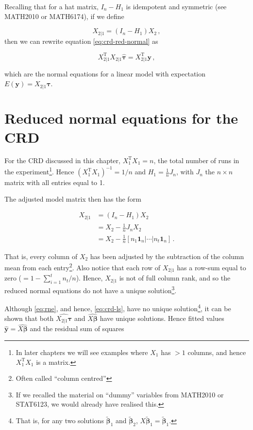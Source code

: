 \documentclass[
]{book}
\theoremstyle{definition}
\theoremstyle{definition}
\theoremstyle{definition}
\theoremstyle{definition}
\theoremstyle{remark}
\begin{document}
Recalling that for a hat matrix, \(I_n - H_1\) is idempotent and symmetric (see MATH2010 or MATH6174), if we define

\[
X_{2|1} = (I_n - H_1)X_2\,,
\]
then we can rewrite equation \eqref{eq:crd-red-normal} as

\begin{equation}
X_{2|1}^{\mathrm{T}}X_{2|1}\hat{\boldsymbol{\tau}} = X_{2|1}^{\mathrm{T}}\boldsymbol{y}\,, 
\label{eq:rne}
\end{equation}

which are the normal equations for a linear model with expectation \(E(\boldsymbol{y}) = X_{2|1}\boldsymbol{\tau}\).

\hypertarget{reduced-normal-equations-for-the-crd}{%
\section{Reduced normal equations for the CRD}\label{reduced-normal-equations-for-the-crd}}

For the CRD discussed in this chapter, \(X_1^{\mathrm{T}}X_1 = n\), the total number of runs in the experiment\footnote{In later chapters we will see examples where \(X_1\) has \(>1\) columns, and hence \(X_1^{\mathrm{T}}X_1\) is a matrix.}. Hence \((X_1^{\mathrm{T}}X_1)^{-1} = 1/n\) and \(H_1 = \frac{1}{n}J_n\), with \(J_n\) the \(n\times n\) matrix with all entries equal to 1.

The adjusted model matrix then has the form

\begin{align*}
X_{2|1} & = (I_n - H_1)X_2 \\
& = X_2 - \frac{1}{n}J_nX_2 \\
& = X_2 - \frac{1}{n}[n_1\boldsymbol{1}_n \vert \cdots \vert n_t\boldsymbol{1}_n]\,. 
\end{align*}

That is, every column of \(X_2\) has been adjusted by the subtraction of the column mean from each entry\footnote{Often called ``column centred''}. Also notice that each row of \(X_{2|1}\) has a row-sum equal to zero (\(= 1 - \sum_{i=1}^tn_t/n\)). Hence, \(X_{2|1}\) is not of full column rank, and so the reduced normal equations do not have a unique solution\footnote{If we recalled the material on ``dummy'' variables from MATH2010 or STAT6123, we would already have realised this.}.

Although \eqref{eq:rne}, and hence, \eqref{eq:crd-ls}, have no unique solution\footnote{That is, for any two solutions \(\tilde{\boldsymbol{\beta}}_1\) and \(\tilde{\boldsymbol{\beta}}_2\), \(X\tilde{\boldsymbol{\beta}}_1 = \tilde{\boldsymbol{\beta}}_1\).}, it can be shown that both \(\widehat{X_{2|1}\boldsymbol{\tau}}\) and \(\widehat{X\boldsymbol{\beta}}\) have unique solutions. Hence fitted values \(\hat{\boldsymbol{y}} = \widehat{X\boldsymbol{\beta}}\) and the residual sum of squares
\end{document}
